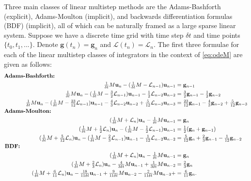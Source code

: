 \documentclass[a4paper,12pt]{article}
\begin{document}
Three main classes of linear multistep methods are the Adams-Bashforth (explicit), Adams-Moulton (implicit), and backwards
differentiation formulas (BDF) (implicit), all of which can be naturally framed as a large sparse linear system. Suppose we have a
discrete time grid with time step $\delta t$ and time points $\{t_0,t_1,...\}$. Denote $\mathbf{g}(t_n) = \mathbf{g}_n$ and
$\mathcal{L}(t_n) = \mathcal{L}_n$. The first three formulae for each of the linear multistep classes of integrators in the context
of \eqref{eq:odeM} are given as follows:
%
{\footnotesize
\begin{align*}
%
\textnormal{\textbf{Adams-Bashforth:}}\hspace{50.5ex}&\\
\tfrac{1}{\delta t}M\mathbf{u}_n - (\tfrac{1}{\delta t}M - \mathcal{L}_{n-1})\mathbf{u}_{n-1} & =\mathbf{g}_{n-1}  \\
\tfrac{1}{\delta t}M\mathbf{u}_n - (\tfrac{1}{\delta t}M - \tfrac{3}{2}\mathcal{L}_{n-1})\mathbf{u}_{n-1} -
	\tfrac{1}{2}\mathcal{L}_{n-2}\mathbf{u}_{n-2} & = \tfrac{3}{2}\mathbf{g}_{n-1} - \tfrac{1}{2}\mathbf{g}_{n-2}\\
\tfrac{1}{\delta t}M\mathbf{u}_n - (\tfrac{1}{\delta t}M - \tfrac{23}{12}\mathcal{L}_{n-1})\mathbf{u}_{n-1} -
	\tfrac{4}{3}\mathcal{L}_{n-2}\mathbf{u}_{n-2} + \tfrac{5}{12}\mathcal{L}_{n-3}\mathbf{u}_{n-3} & = \tfrac{23}{12}\mathbf{g}_{n-1} -
	\tfrac{4}{3}\mathbf{g}_{n-2} + \tfrac{5}{12}\mathbf{g}_{n-3}\\
%
\textnormal{\textbf{Adams-Moulton:}}\hspace{52ex}&\\
(\tfrac{1}{\delta t}M +  \mathcal{L}_n)\mathbf{u}_n - \tfrac{1}{\delta t}M\mathbf{u}_{n-1} &  =   \mathbf{g}_n \\
(\tfrac{1}{\delta t}M + \tfrac{1}{2} \mathcal{L}_n)\mathbf{u}_n - (\tfrac{1}{\delta t}M - \tfrac{1}{2} \mathcal{L}_{n-1})\mathbf{u}_{n-1} & =
	\tfrac{1}{2}  (\mathbf{g}_n + \mathbf{g}_{n-1}) \\
(\tfrac{1}{\delta t}M + \tfrac{5}{12} \mathcal{L}_n)\mathbf{u}_n - (\tfrac{1}{\delta t}M - \tfrac{2}{3} \mathcal{L}_{n-1})\mathbf{u}_{n-1} - 
	\tfrac{1}{12}\mathcal{L}_{n-2}\mathbf{u}_{n-2}& = \tfrac{5}{12} \mathbf{g}_n + \tfrac{2}{3} \mathbf{g}_{n-1} -
	\tfrac{1}{12} \mathbf{g}_{n-2}\\
%
\textnormal{\textbf{BDF:}}\hspace{65ex}&\\
(\tfrac{1}{\delta t}M + \mathcal{L}_n)\mathbf{u}_n - \tfrac{1}{\delta t}M\mathbf{u}_{n-1} &  =   \mathbf{g}_n \\
(\tfrac{1}{\delta t}M + \tfrac{2}{3} \mathcal{L}_n)\mathbf{u}_{n} - \tfrac{4}{3\delta t}M\mathbf{u}_{n-1} +
 	\tfrac{1}{3\delta t}M\mathbf{u}_{n-2} & = \tfrac{2}{3}\mathbf{g}_n \\
(\tfrac{1}{\delta t}M + \tfrac{6}{11} \mathcal{L}_n)\mathbf{u}_{n} - \tfrac{18}{11\delta t}\mathbf{u}_{n-1} +
	\tfrac{9}{11\delta t}M\mathbf{u}_{n-2} - \tfrac{2}{11\delta t}M\mathbf{u}_{n-3} +  & =   \tfrac{6}{11}  \mathbf{g}_n.
\end{align*}
}
\end{document}
